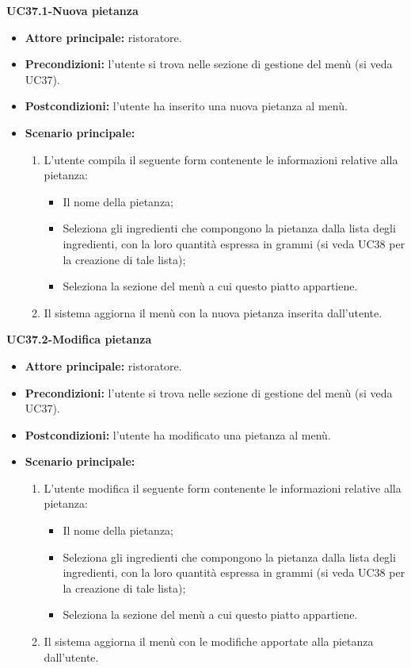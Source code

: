 \textbf{UC37.1-Nuova pietanza}  
\begin{itemize}
    \item \textbf{Attore principale:} ristoratore.
    \item \textbf{Precondizioni:} l'utente si trova nelle sezione di gestione del menù (si veda UC37).
    \item \textbf{Postcondizioni:} l'utente ha inserito una nuova pietanza al menù.
    \item \textbf{Scenario principale:}
    \begin{enumerate}
        \item L'utente compila il seguente form contenente le informazioni relative alla pietanza:
        \begin{itemize}
            \item Il nome della pietanza;
            \item Seleziona gli ingredienti che compongono la pietanza dalla lista degli ingredienti, con la loro quantità espressa in grammi (si veda UC38 per la creazione di tale lista);
            \item Seleziona la sezione del menù a cui questo piatto appartiene.
        \end{itemize}
        \item Il sistema aggiorna il menù con la nuova pietanza inserita dall'utente.
    \end{enumerate}
\end{itemize}

\textbf{UC37.2-Modifica pietanza}  
\begin{itemize}
    \item \textbf{Attore principale:} ristoratore.
    \item \textbf{Precondizioni:} l'utente si trova nelle sezione di gestione del menù (si veda UC37).
    \item \textbf{Postcondizioni:} l'utente ha modificato una pietanza al menù.
    \item \textbf{Scenario principale:}
    \begin{enumerate}
        \item L'utente modifica il seguente form contenente le informazioni relative alla pietanza:
        \begin{itemize}
            \item Il nome della pietanza;
            \item Seleziona gli ingredienti che compongono la pietanza dalla lista degli ingredienti, con la loro quantità espressa in grammi (si veda UC38 per la creazione di tale lista);
            \item Seleziona la sezione del menù a cui questo piatto appartiene.
        \end{itemize}
        \item Il sistema aggiorna il menù con le modifiche apportate alla pietanza dall'utente.
    \end{enumerate}
\end{itemize}

